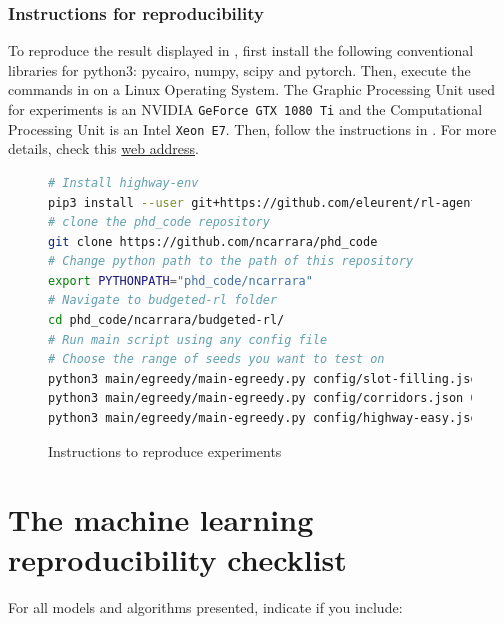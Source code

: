 \subsubsection{Instructions for reproducibility}
\label{subsubsec:instruction-reproducibility}
To reproduce the result displayed in , first install the following conventional libraries for python3: pycairo, numpy, scipy and pytorch. Then, execute the commands in  on a Linux Operating System. The Graphic Processing Unit used for experiments is an NVIDIA \texttt{GeForce GTX 1080 Ti} and the Computational Processing Unit is an Intel \texttt{Xeon E7}. Then, follow the instructions in . For more details, check this \href{https://github.com/budgeted-rl/budgeted-rl.github.io\#how-to-reproduce}{web address}.

\begin{figure}
    \centering
    

\begin{lstlisting}[language=bash,caption={bash version}]
# Install highway-env
pip3 install --user git+https://github.com/eleurent/rl-agents
# clone the phd_code repository
git clone https://github.com/ncarrara/phd_code
# Change python path to the path of this repository
export PYTHONPATH="phd_code/ncarrara"
# Navigate to budgeted-rl folder
cd phd_code/ncarrara/budgeted-rl/
# Run main script using any config file
# Choose the range of seeds you want to test on
python3 main/egreedy/main-egreedy.py config/slot-filling.json 0 6
python3 main/egreedy/main-egreedy.py config/corridors.json 0 4
python3 main/egreedy/main-egreedy.py config/highway-easy.json 0 10
\end{lstlisting}

\caption{Instructions to reproduce experiments}
    \label{fig:instructions}
\end{figure}


\section{The machine learning reproducibility checklist}
\label{sec:ml-checklist}
For all models and algorithms presented, indicate if you include: 


